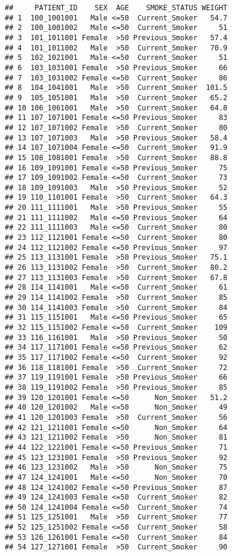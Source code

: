 \documentclass[
]{article}
\begin{document}
\begin{verbatim}
##     PATIENT_ID    SEX  AGE    SMOKE_STATUS WEIGHT
## 1  100_1001001   Male <=50  Current_Smoker   54.7
## 2  100_1001002   Male <=50  Current_Smoker     51
## 3  101_1011001 Female  >50 Previous_Smoker   57.4
## 4  101_1011002   Male  >50  Current_Smoker   70.9
## 5  102_1021001   Male <=50  Current_Smoker     51
## 6  103_1031001 Female  >50 Previous_Smoker     66
## 7  103_1031002 Female <=50  Current_Smoker     86
## 8  104_1041001   Male  >50  Current_Smoker  101.5
## 9  105_1051001   Male  >50  Current_Smoker   65.2
## 10 106_1061001   Male  >50  Current_Smoker   64.8
## 11 107_1071001 Female <=50 Previous_Smoker     83
## 12 107_1071002 Female  >50  Current_Smoker     80
## 13 107_1071003   Male  >50 Previous_Smoker   58.4
## 14 107_1071004 Female <=50  Current_Smoker   91.9
## 15 108_1081001 Female  >50  Current_Smoker   88.8
## 16 109_1091001 Female <=50 Previous_Smoker     75
## 17 109_1091002 Female <=50  Current_Smoker     73
## 18 109_1091003   Male  >50 Previous_Smoker     52
## 19 110_1101001 Female  >50  Current_Smoker   64.3
## 20 111_1111001   Male  >50 Previous_Smoker     55
## 21 111_1111002   Male <=50 Previous_Smoker     64
## 22 111_1111003   Male <=50  Current_Smoker     80
## 23 112_1121001 Female <=50  Current_Smoker     80
## 24 112_1121002 Female <=50 Previous_Smoker     97
## 25 113_1131001 Female  >50 Previous_Smoker   75.1
## 26 113_1131002 Female  >50  Current_Smoker   80.2
## 27 113_1131003 Female  >50  Current_Smoker   67.8
## 28 114_1141001   Male <=50  Current_Smoker     61
## 29 114_1141002 Female  >50  Current_Smoker     85
## 30 114_1141003 Female  >50  Current_Smoker     84
## 31 115_1151001   Male <=50 Previous_Smoker     65
## 32 115_1151002 Female <=50  Current_Smoker    109
## 33 116_1161001   Male  >50 Previous_Smoker     50
## 34 117_1171001 Female <=50 Previous_Smoker     62
## 35 117_1171002 Female <=50  Current_Smoker     92
## 36 118_1181001 Female  >50  Current_Smoker     72
## 37 119_1191001 Female  >50 Previous_Smoker     66
## 38 119_1191002 Female  >50 Previous_Smoker     85
## 39 120_1201001 Female <=50      Non_Smoker   51.2
## 40 120_1201002   Male <=50      Non_Smoker     49
## 41 120_1201003 Female  >50  Current_Smoker     56
## 42 121_1211001 Female <=50      Non_Smoker     64
## 43 121_1211002 Female  >50      Non_Smoker     81
## 44 122_1221001 Female <=50 Previous_Smoker     71
## 45 123_1231001 Female  >50 Previous_Smoker     92
## 46 123_1231002   Male  >50      Non_Smoker     75
## 47 124_1241001   Male <=50      Non_Smoker     70
## 48 124_1241002 Female <=50 Previous_Smoker     87
## 49 124_1241003 Female <=50  Current_Smoker     82
## 50 124_1241004 Female <=50  Current_Smoker     74
## 51 125_1251001   Male  >50  Current_Smoker     77
## 52 125_1251002 Female <=50  Current_Smoker     58
## 53 126_1261001 Female <=50  Current_Smoker     84
## 54 127_1271001 Female  >50  Current_Smoker     90
\end{verbatim}
\end{document}
